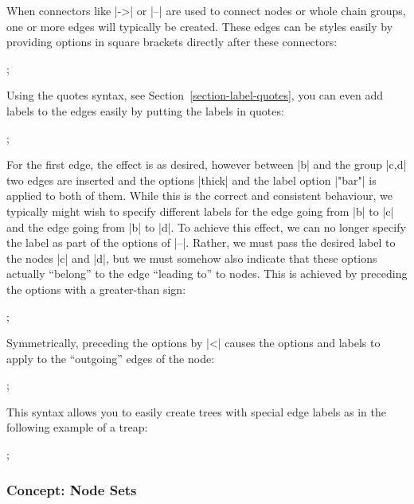 When connectors like |->| or |--| are used to connect nodes or whole chain
groups, one or more edges will typically be created. These edges can be styles
easily by providing options in square brackets directly after these connectors:
%
\begin{codeexample}[]
\tikz {};
\end{codeexample}

Using the quotes syntax, see Section~\ref{section-label-quotes}, you can even
add labels to the edges easily by putting the labels in quotes:
%
\begin{codeexample}[]
\tikz {};
\end{codeexample}

For the first edge, the effect is as desired, however between |b| and the group
|{c,d}| two edges are inserted and the options |thick| and the label option
|"bar"| is applied to both of them. While this is the correct and consistent
behaviour, we typically might wish to specify different labels for the edge
going from |b| to |c| and the edge going from |b| to |d|. To achieve this
effect, we can no longer specify the label as part of the options of |--|.
Rather, we must pass the desired label to the nodes |c| and |d|, but we must
somehow also indicate that these options actually ``belong'' to the edge
``leading to'' to nodes. This is achieved by preceding the options with a
greater-than sign:
%
\begin{codeexample}[]
\tikz {};
\end{codeexample}

Symmetrically, preceding the options by |<| causes the options and labels to
apply to the ``outgoing'' edges of the node:
%
\begin{codeexample}[]
\tikz {};
\end{codeexample}

This syntax allows you to easily create trees with special edge labels as in
the following example of a treap:
%
\begin{codeexample}[]
\tikz
  ;
\end{codeexample}


\subsubsection{Concept: Node Sets}

